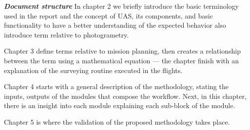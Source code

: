  \textit{\textbf{Document structure}}
In chapter 2 we briefly introduce the basic terminology used in the report and the concept of UAS, its components, and basic functionality to have a better understanding of the expected behavior also introduce term relative to photogrametry.

Chapter 3 define terms relative to mission planning, then creates a relationship between the term using a mathematical equation — the chapter finish with an explanation of the surveying routine executed in the flights.

Chapter 4 starts with a general description of the methodology, stating the inputs, outputs of the modules that compose the workflow. Next, in this chapter, there is an insight into each module explaining each sub-block of the module.

Chapter 5 is where the validation of the proposed methodology takes place. 


